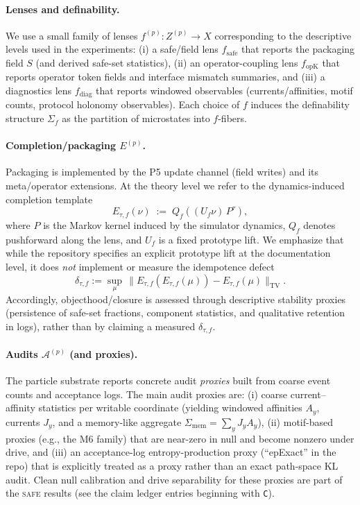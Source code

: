 \documentclass[11pt]{article}
\newcommand{\Audit}{\mathcal A}
\newcommand{\TV}{\mathrm{TV}}
\newcommand{\Sig}{\Sigma}
\newcommand{\SAFE}{\textsc{safe}}
\begin{document}
\paragraph{Lenses and definability.}
We use a small family of lenses $f^{(p)}:Z^{(p)}\to X$ corresponding to the descriptive levels used in the experiments:
(i) a safe/field lens $f_{\mathrm{safe}}$ that reports the packaging field $S$ (and derived safe-set statistics),
(ii) an operator-coupling lens $f_{\mathrm{opK}}$ that reports operator token fields and interface mismatch summaries, and
(iii) a diagnostics lens $f_{\mathrm{diag}}$ that reports windowed observables (currents/affinities, motif counts, protocol holonomy observables).
Each choice of $f$ induces the definability structure $\Sig_f$ as the partition of microstates into $f$-fibers.

\paragraph{Completion/packaging $E^{(p)}$.}
Packaging is implemented by the P5 update channel (field writes) and its meta/operator extensions. At the theory level we refer to the dynamics-induced completion template
\[
E_{\tau,f}(\nu)\;:=\;Q_f\!\left((U_f\nu)\,P^\tau\right),
\]
where $P$ is the Markov kernel induced by the simulator dynamics, $Q_f$ denotes pushforward along the lens, and $U_f$ is a fixed prototype lift. We emphasize that while the repository specifies an explicit prototype lift at the documentation level, it does \emph{not} implement or measure the idempotence defect
\[
\delta_{\tau,f}:=\sup_{\mu}\,\bigl\|E_{\tau,f}(E_{\tau,f}(\mu))-E_{\tau,f}(\mu)\bigr\|_{\TV}.
\]
Accordingly, objecthood/closure is assessed through descriptive stability proxies (persistence of safe-set fractions, component statistics, and qualitative retention in logs), rather than by claiming a measured $\delta_{\tau,f}$.

\paragraph{Audits $\Audit^{(p)}$ (and proxies).}
The particle substrate reports concrete audit \emph{proxies} built from coarse event counts and acceptance logs. The main audit proxies are: (i) coarse current--affinity statistics per writable coordinate (yielding windowed affinities $A_y$, currents $J_y$, and a memory-like aggregate $\Sigma_{\mathrm{mem}}=\sum_y J_yA_y$), (ii) motif-based proxies (e.g., the M6 family) that are near-zero in null and become nonzero under drive, and (iii) an acceptance-log entropy-production proxy (``epExact'' in the repo) that is explicitly treated as a proxy rather than an exact path-space KL audit. Clean null calibration and drive separability for these proxies are part of the \SAFE{} results (see the claim ledger entries beginning with \texttt{C}).
\end{document}
